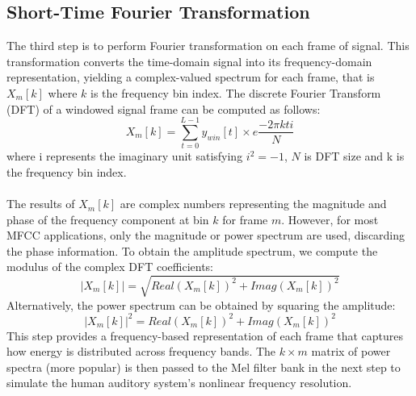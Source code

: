 \subsection{Short-Time Fourier Transformation}
The third step is to perform Fourier transformation on each frame of signal. This transformation converts the time-domain signal into its frequency-domain representation, yielding a complex-valued spectrum for each frame, that is $X_m[k]$ where $k$ is the frequency bin index. The discrete Fourier Transform (DFT) of a windowed signal frame can be computed as follows:\\
\begin{equation}
X_m[k]=\sum_{t=0}^{L-1}y_{win}[t]\times e{\frac{-2\pi kti}{N}} \label{DFT}
\end{equation}
where i represents the imaginary unit satisfying $i^2=-1$, $N$ is DFT size and k is the frequency bin index.\\
\\
The results of $X_m[k]$ are complex numbers representing the magnitude and phase of the frequency component at bin $k$ for frame $m$. However, for most MFCC applications, only the magnitude or power spectrum are used, discarding the phase information. To obtain the amplitude spectrum, we compute the modulus of the complex DFT coefficients: \\
\begin{equation}
|X_m[k]|=\sqrt{Real(X_m[k])^2+Imag(X_m[k])^2}
\end{equation} 
Alternatively, the power spectrum can be obtained by squaring the amplitude:
\begin{equation}
|X_m[k]|^2=Real(X_m[k])^2+Imag(X_m[k])^2
\end{equation}
This step provides a frequency-based representation of each frame that captures how energy is distributed across frequency bands. The $k\times m$ matrix of power spectra (more popular) is then passed to the Mel filter bank in the next step to simulate the human auditory system’s nonlinear frequency resolution.\\
